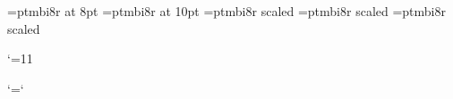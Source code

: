 %
\let\bigfont=\frtrm
\let\Bigfont=\svtrm
\let\BIgfont=\twtyrm
\let\BIGfont=\twfvrm
%
%
\font\ppfftwelve=ptmbi8r at 8pt
\font\ppffsixteen=ptmbi8r at 10pt
\font\ppfftwenty=ptmbi8r scaled 
\font\ppfftwentyfour=ptmbi8r scaled 
\font\ppfftwentynine=ptmbi8r scaled 
%
\def\tinydyn{\let\ppff\tinyppff}  
\def\smalldyn{let\ppff\smallppff}
\def\normdyn{\let\ppff\normppff}
\def\meddyn{\let\ppff\medppff}
%
\def\f{{\ppff f}}
\def\ff{{\ppff ff}}
\def\fp{{\ppff fp}}
\def\fff{{\ppff fff}}
\def\ffff{{\ppff ffff}}
\def\mf{{\ppff mf}}
\def\p{{\ppff p}}
\def\pp{{\ppff pp}}
\def\ppp{{\ppff ppp}}
\def\pppp{{\ppff pppp}}

\edef\catcodeat{\the\catcode`\@}\catcode`\@=11
%
\def\sF{{\ppff s\p@kern f}}
\def\sfz{{\ppff s\p@kern f\f@kern z}}
\def\sfzp{{\ppff s\p@kern f\f@kern z\p@kern p}}

\def\mp@{{\ppff mp}}
\let\mezzopiano\mp@
\catcode`\@=\catcodeat

\def\smalltype{%
  \let\rm\eightrm
  \let\bf\eightbf
  \let\it\eightit
  \let\bi\eightbi
  \let\sc\eightsc
  \let\sl\eightsl
  \rm}
\def\Smalltype{%
  \let\rm\ninerm
  \let\bf\ninebf
  \let\it\nineit
  \let\bi\ninebi
  \let\sc\ninesc
  \let\sl\ninesl
  \rm}
\def\normtype{%
  \let\rm\tenrm
  \let\bf\tenbf
  \let\it\tenit
  \let\bi\tenbi
  \let\sc\tensc
  \let\sl\tensl
  \rm}
\def\medtype{%
  \let\rm\twelverm
  \let\bf\twelvebf
  \let\it\twelveit
  \let\bi\twelvebi
  \let\sc\twelvesc
  \let\sl\twelvesl
  \rm}
\def\bigtype{%
  \let\rm\bigfont
  \let\bf\bigfont
  \let\it\bigfont
  \let\bi\bigfont
  \let\sc\bigfont
  \let\sl\bigfont
  \rm}
\def\Bigtype{%
  \let\rm\Bigfont
  \let\bf\Bigfont
  \let\it\Bigfont
  \let\bi\Bigfont
  \let\sc\Bigfont
  \let\sl\Bigfont
  \rm}
\def\BIgtype{%
  \let\rm\BIgfont
  \let\bf\BIgfont
  \let\it\BIgfont
  \let\bi\Bigfont
  \let\sc\Bigfont
  \let\sl\Bigfont
  \rm}
\def\BIGtype{%
  \let\rm\BIGfont
  \let\bf\BIGfont
  \let\it\BIGfont
  \let\bi\BIGfont
  \let\sc\BIGfont
  \let\sl\BIGfont
  \rm}

%
%

\normtype
\endinput
